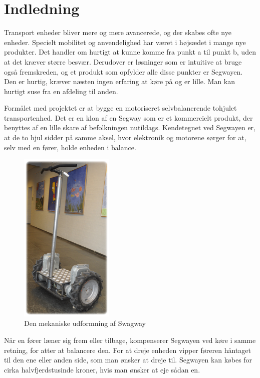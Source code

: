 \documentclass[a4paper,oneside,article,danish,table]{memoir}
\begin{document}
\chapter{Indledning}\label{chap:ind}
Transport enheder bliver mere og mere avancerede, og der skabes ofte nye enheder. Specielt mobilitet og anvendelighed har været i højsædet i mange nye produkter. Det handler om hurtigt at kunne komme fra punkt a til punkt b, uden at det kræver større besvær. Derudover er løsninger som er intuitive at bruge også fremskreden, og et produkt som opfylder alle disse punkter er Segwayen. Den er hurtig, kræver næsten ingen erfaring at køre på og er lille. Man kan hurtigt suse fra en afdeling til anden. 

Formålet med projektet er at bygge en motoriseret selvbalancrende tohjulet transportenhed. Det er en klon af en Segway som er et kommercielt produkt, der benyttes af en lille skare af befolkningen nutildags. Kendetegnet ved Segwayen er, at de to hjul sidder på samme aksel, hvor elektronik og motorene sørger for at, selv med en fører, holde enheden i balance.
\begin{figure}[htbp]
  \centering
  \includegraphics[width=0.4\textwidth]{pictures/swagway.jpg}
  \caption{Den mekaniske udformning af Swagway}
\end{figure}
Når en fører læner sig frem eller tilbage, kompenserer Segwayen ved køre i samme retning, for atter at balancere den. For at dreje enheden vipper føreren håntaget til den ene eller anden side, som man ønsker at dreje til. Segwayen kan købes for cirka halvfjerdstusinde kroner, hvis man ønsker at eje sådan en.
\end{document}
